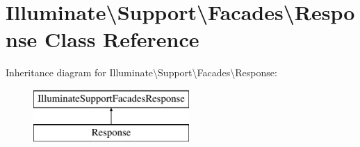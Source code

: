 \hypertarget{class_illuminate_1_1_support_1_1_facades_1_1_response}{}\section{Illuminate\textbackslash{}Support\textbackslash{}Facades\textbackslash{}Response Class Reference}
\label{class_illuminate_1_1_support_1_1_facades_1_1_response}
Inheritance diagram for Illuminate\textbackslash{}Support\textbackslash{}Facades\textbackslash{}Response\+:\begin{figure}[H]
\begin{center}
\leavevmode
\includegraphics[height=2.000000cm]{class_illuminate_1_1_support_1_1_facades_1_1_response}
\end{center}
\end{figure}
